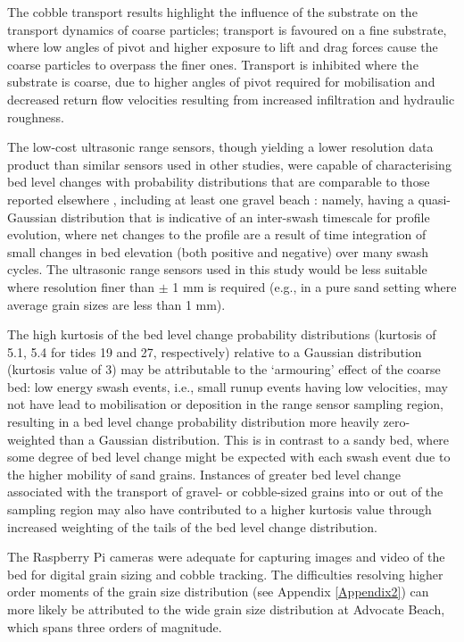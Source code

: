 The cobble transport results highlight the influence of the substrate on the transport dynamics of coarse particles; transport is favoured on a fine substrate, where low angles of pivot and higher exposure to lift and drag forces cause the coarse particles to overpass the finer ones. Transport is inhibited where the substrate is coarse, due to higher angles of pivot required for mobilisation and decreased return flow velocities resulting from increased infiltration and hydraulic roughness.

The low-cost ultrasonic range sensors, though yielding a lower resolution data product than similar sensors used in other studies, were capable of characterising bed level changes with probability distributions that are comparable to those reported elsewhere \citep[e.g.,][]{Turner_etal2008, Blenkinsopp_etal2011}, including at least one gravel beach \citep{Russell_etal2009}: namely, having a quasi-Gaussian distribution that is indicative of an inter-swash timescale for profile evolution, where net changes to the profile are a result of time integration of small changes in bed elevation (both positive and negative) over many swash cycles. The ultrasonic range sensors used in this study would be less suitable where resolution finer than $\pm$ 1 mm is required (e.g., in a pure sand setting where average grain sizes are less than 1 mm).

The high kurtosis of the bed level change probability distributions (kurtosis of 5.1, 5.4 for tides 19 and 27, respectively) relative to a Gaussian distribution (kurtosis value of 3) may be attributable to the `armouring' effect of the coarse bed: low energy swash events, i.e., small runup events having low velocities, may not have lead to mobilisation or deposition in the range sensor sampling region, resulting in a bed level change probability distribution more heavily zero-weighted than a Gaussian distribution. This is in contrast to a sandy bed, where some degree of bed level change might be expected with each swash event due to the higher mobility of sand grains. Instances of greater bed level change associated with the transport of gravel- or cobble-sized grains into or out of the sampling region may also have contributed to a higher kurtosis value through increased weighting of the tails of the bed level change distribution.

The Raspberry Pi cameras were adequate for capturing images and video of the bed for digital grain sizing and cobble tracking. The difficulties resolving higher order moments of the grain size distribution (see Appendix \ref{Appendix2}) can more likely be attributed to the wide grain size distribution at Advocate Beach, which spans three orders of magnitude.

